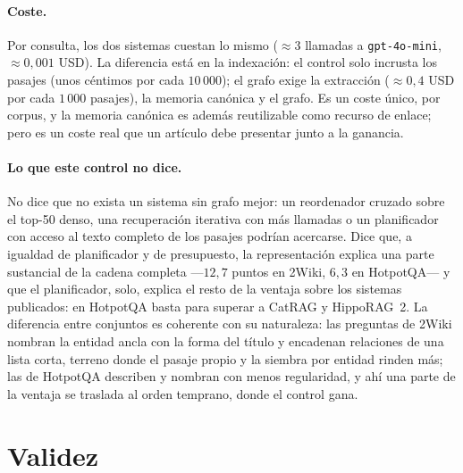 \documentclass[11pt,a4paper]{article}
\newcommand{\hippo}{HippoRAG~2}
\begin{document}
\paragraph{Coste.}
Por consulta, los dos sistemas cuestan lo mismo ($\approx 3$ llamadas a
\texttt{gpt-4o-mini}, $\approx 0{,}001$ USD). La diferencia está en la
indexación: el control solo incrusta los pasajes (unos céntimos por cada
$10\,000$); el grafo exige la extracción ($\approx 0{,}4$ USD por cada
$1\,000$ pasajes), la memoria canónica y el grafo. Es un coste único, por
corpus, y la memoria canónica es además reutilizable como recurso de
enlace; pero es un coste real que un artículo debe presentar junto a la
ganancia.

\paragraph{Lo que este control no dice.}
No dice que no exista un sistema sin grafo mejor: un reordenador cruzado
sobre el top-50 denso, una recuperación iterativa con más llamadas o un
planificador con acceso al texto completo de los pasajes podrían
acercarse. Dice que, a igualdad de planificador y de presupuesto, la
representación explica una parte sustancial de la cadena completa
---$12{,}7$ puntos en 2Wiki, $6{,}3$ en HotpotQA--- y que el planificador,
solo, explica el resto de la ventaja sobre los sistemas publicados: en
HotpotQA basta para superar a CatRAG y \hippo{}. La diferencia entre
conjuntos es coherente con su naturaleza: las preguntas de 2Wiki nombran la
entidad ancla con la forma del título y encadenan relaciones de una lista
corta, terreno donde el pasaje propio y la siembra por entidad rinden más;
las de HotpotQA describen y nombran con menos regularidad, y ahí una parte
de la ventaja se traslada al orden temprano, donde el control gana.

\section{Validez}
\label{sec:validez}
\end{document}
